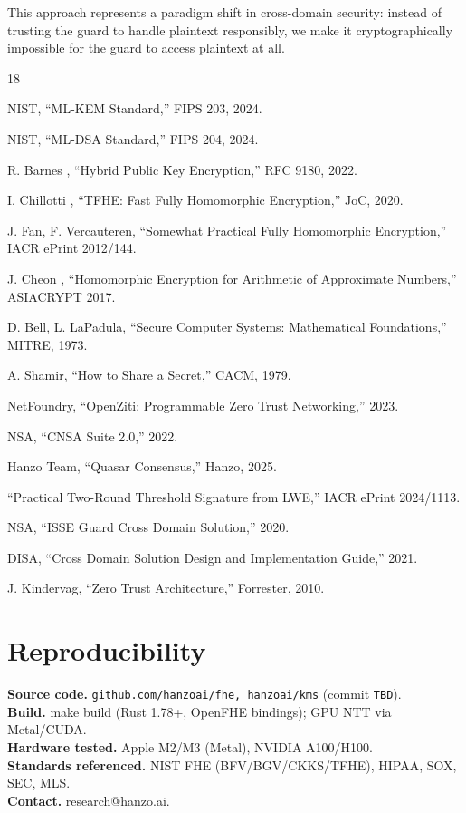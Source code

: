 \documentclass[11pt,letterpaper]{article}
\begin{document}
This approach represents a paradigm shift in cross-domain security: instead of trusting the guard to handle plaintext responsibly, we make it cryptographically impossible for the guard to access plaintext at all.

\begin{thebibliography}{18}

 NIST, ``ML-KEM Standard,'' FIPS 203, 2024.

 NIST, ``ML-DSA Standard,'' FIPS 204, 2024.

 R. Barnes \etal, ``Hybrid Public Key Encryption,'' RFC 9180, 2022.

 I. Chillotti \etal, ``TFHE: Fast Fully Homomorphic Encryption,'' JoC, 2020.

 J. Fan, F. Vercauteren, ``Somewhat Practical Fully Homomorphic Encryption,'' IACR ePrint 2012/144.

 J. Cheon \etal, ``Homomorphic Encryption for Arithmetic of Approximate Numbers,'' ASIACRYPT 2017.

 D. Bell, L. LaPadula, ``Secure Computer Systems: Mathematical Foundations,'' MITRE, 1973.

 A. Shamir, ``How to Share a Secret,'' CACM, 1979.

 NetFoundry, ``OpenZiti: Programmable Zero Trust Networking,'' 2023.

 NSA, ``CNSA Suite 2.0,'' 2022.

 Hanzo Team, ``Quasar Consensus,'' Hanzo, 2025.

 ``Practical Two-Round Threshold Signature from LWE,'' IACR ePrint 2024/1113.

 NSA, ``ISSE Guard Cross Domain Solution,'' 2020.

 DISA, ``Cross Domain Solution Design and Implementation Guide,'' 2021.

 J. Kindervag, ``Zero Trust Architecture,'' Forrester, 2010.

\end{thebibliography}

\section*{Reproducibility}
\textbf{Source code.} \texttt{github.com/hanzoai/fhe, hanzoai/kms} (commit \texttt{TBD}).\\
\textbf{Build.} make build (Rust 1.78+, OpenFHE bindings); GPU NTT via Metal/CUDA.\\
\textbf{Hardware tested.} Apple M2/M3 (Metal), NVIDIA A100/H100.\\
\textbf{Standards referenced.} NIST FHE (BFV/BGV/CKKS/TFHE), HIPAA, SOX, SEC, MLS.\\
\textbf{Contact.} research@hanzo.ai.
\end{document}
